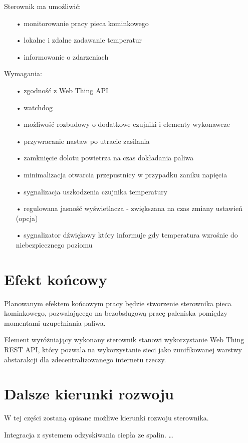 \documentclass[12pt]{report}
\begin{document}
 Sterownik ma umożliwić:
 \begin{enumerate}
 \item[•] monitorowanie pracy pieca kominkowego
 \item[•] lokalne i zdalne zadawanie temperatur
 \item[•] informowanie o zdarzeniach
 \end{enumerate}
 
 Wymagania:
 \begin{enumerate}
 \item[•] zgodność z Web Thing API
 \item[•] watchdog
 \item[•] możliwość rozbudowy o dodatkowe czujniki i elementy wykonawcze
 \item[•] przywracanie nastaw po utracie zasilania
 \item[•] zamknięcie dolotu powietrza na czas dokładania paliwa
 \item[•] minimalizacja otwarcia przepustnicy w przypadku zaniku napięcia
 \item[•] sygnalizacja uszkodzenia czujnika temperatury
 \item[•] regulowana jasność wyświetlacza - zwiększana na czas zmiany ustawień (opcja)
 \item[•] sygnalizator dźwiękowy który informuje gdy temperatura wzrośnie do niebezpiecznego poziomu
 \end{enumerate}
 
  
 
 \section{Efekt końcowy}
 Planowanym efektem końcowym pracy będzie stworzenie sterownika pieca kominkowego, pozwalającego na bezobsługową pracę paleniska pomiędzy momentami uzupełniania paliwa.

 Element wyróżniający wykonany sterownik stanowi wykorzystanie Web Thing REST API, który pozwala na wykorzystanie sieci jako zunifikowanej warstwy abstarakcji dla zdecentralizowanego internetu rzeczy.
 
 \section{Dalsze kierunki rozwoju}
 W tej części zostaną opisane możliwe kierunki rozwoju sterownika.
 
 Integracja z systemem odzyskiwania ciepła ze spalin.
 \ldots
 
\end{document}
